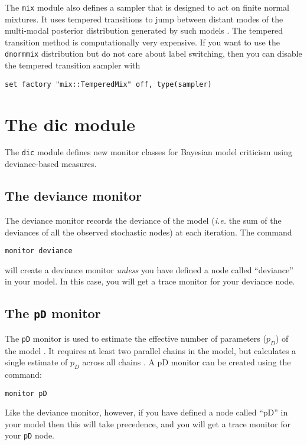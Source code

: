 \documentclass[11pt, a4paper, titlepage]{report}
\begin{document}
The \verb+mix+ module also defines a sampler that is designed to act
on finite normal mixtures. It uses tempered transitions to jump
between distant modes of the multi-modal posterior distribution
generated by such models \cite{Neal94,Celeux99}. The tempered
transition method is computationally very expensive. If you want to
use the \verb+dnormmix+ distribution but do not care about label
switching, then you can disable the tempered transition sampler with
\begin{verbatim}
set factory "mix::TemperedMix" off, type(sampler)
\end{verbatim}

\section{The dic module}

The \verb+dic+ module defines new monitor classes for Bayesian model
criticism using deviance-based measures. 

\subsection{The deviance monitor}

The deviance monitor records the deviance of the model ({\em i.e.} the
sum of the deviances of all the observed stochastic nodes) at each
iteration. The command
\begin{verbatim}
monitor deviance
\end{verbatim}
will create a deviance monitor {\em unless} you have defined a node
called ``deviance'' in your model. In this case, you will get a trace
monitor for your deviance node.

\subsection{The \texttt{pD} monitor}

The \verb+pD+ monitor is used to estimate the effective number of
parameters ($p_D$) of the model \cite{spiegelhalter:etal:2002}. It
requires at least two parallel chains in the model, but calculates
a single estimate of $p_D$ across all chains \cite{plummer:2002}.
A pD monitor can be created using the command:
\begin{verbatim}
monitor pD
\end{verbatim}
Like the deviance monitor, however, if you have defined a node called
``pD'' in your model then this will take precedence, and you will get
a trace monitor for your \verb+pD+ node.
\end{document}
